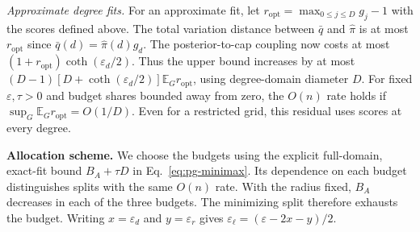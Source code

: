 \emph{Approximate degree fits.}
For an approximate fit, let $r_{\mathrm{opt}}=\max_{0\leq j\leq D}g_j-1$ with the scores defined above.
The total variation distance between $\bar q$ and $\widehat\pi$ is at most $r_{\mathrm{opt}}$ since $\bar q(d)=\widehat\pi(d)g_d$. The posterior-to-cap coupling now costs at most $(1+r_{\mathrm{opt}})\coth(\varepsilon_d/2)$.
Thus the upper bound increases by at most $(D-1)[D+\coth(\varepsilon_d/2)]\mathbb E_G r_{\mathrm{opt}}$, using degree-domain diameter $D$.
For fixed $\varepsilon,\tau>0$ and budget shares bounded away from zero, the $O(n)$ rate holds if $\sup_G\mathbb E_G r_{\mathrm{opt}}=O(1/D)$. Even for a restricted grid, this residual uses scores at every degree.

\noindent\textbf{Allocation scheme.}
We choose the budgets using the explicit full-domain, exact-fit bound $B_A+\tau D$ in Eq.~\eqref{eq:pg-minimax}. Its dependence on each budget distinguishes splits with the same $O(n)$ rate.
With the radius fixed, $B_A$ decreases in each of the three budgets. The minimizing split therefore exhausts the budget.
Writing $x=\varepsilon_d$ and $y=\varepsilon_r$ gives $\varepsilon_\ell=(\varepsilon-2x-y)/2$.

